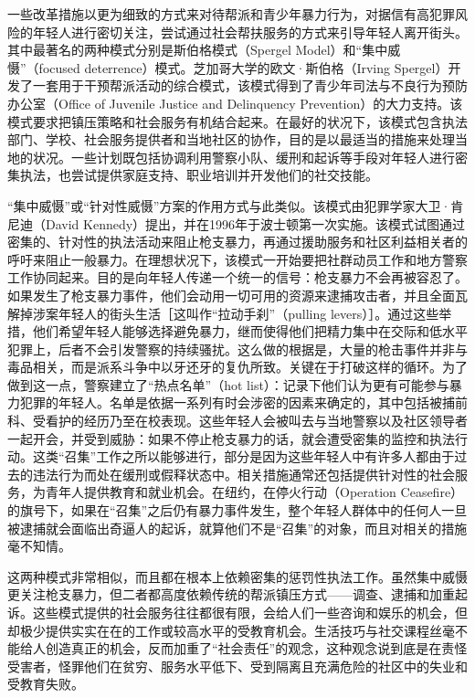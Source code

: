 \documentclass[fontset=fandol, a4paper, 12pt, openright]{ctexbook}
\begin{document}
一些改革措施以更为细致的方式来对待帮派和青少年暴力行为，对据信有高犯罪风险的年轻人进行密切关注，尝试通过社会帮扶服务的方式来引导年轻人离开街头。其中最著名的两种模式分别是斯伯格模式（Spergel Model）和“集中威慑”（focused deterrence）模式。芝加哥大学的欧文·斯伯格（Irving Spergel）开发了一套用于干预帮派活动的综合模式，该模式得到了青少年司法与不良行为预防办公室（Office of Juvenile Justice and Delinquency Prevention）的大力支持。该模式要求把镇压策略和社会服务有机结合起来。在最好的状况下，该模式包含执法部门、学校、社会服务提供者和当地社区的协作，目的是以最适当的措施来处理当地的状况。一些计划既包括协调利用警察小队、缓刑和起诉等手段对年轻人进行密集执法，也尝试提供家庭支持、职业培训并开发他们的社交技能。

“集中威慑”或“针对性威慑”方案的作用方式与此类似。该模式由犯罪学家大卫·肯尼迪（David Kennedy）提出，并在1996年于波士顿第一次实施。该模式试图通过密集的、针对性的执法活动来阻止枪支暴力，再通过援助服务和社区利益相关者的呼吁来阻止一般暴力。在理想状况下，该模式一开始要把社群动员工作和地方警察工作协同起来。目的是向年轻人传递一个统一的信号：枪支暴力不会再被容忍了。如果发生了枪支暴力事件，他们会动用一切可用的资源来逮捕攻击者，并且全面瓦解掉涉案年轻人的街头生活［这叫作“拉动手刹”（pulling levers）］。通过这些举措，他们希望年轻人能够选择避免暴力，继而使得他们把精力集中在交际和低水平犯罪上，后者不会引发警察的持续骚扰。这么做的根据是，大量的枪击事件并非与毒品相关，而是派系斗争中以牙还牙的复仇所致。关键在于打破这样的循环。为了做到这一点，警察建立了“热点名单”（hot list）：记录下他们认为更有可能参与暴力犯罪的年轻人。名单是依据一系列有时会涉密的因素来确定的，其中包括被捕前科、受看护的经历乃至在校表现。这些年轻人会被叫去与当地警察以及社区领导者一起开会，并受到威胁：如果不停止枪支暴力的话，就会遭受密集的监控和执法行动。这类“召集”工作之所以能够进行，部分是因为这些年轻人中有许多人都由于过去的违法行为而处在缓刑或假释状态中。相关措施通常还包括提供针对性的社会服务，为青年人提供教育和就业机会。在纽约，在停火行动（Operation Ceasefire）的旗号下，如果在“召集”之后仍有暴力事件发生，整个年轻人群体中的任何人一旦被逮捕就会面临出奇逼人的起诉，就算他们不是“召集”的对象，而且对相关的措施毫不知情。



这两种模式非常相似，而且都在根本上依赖密集的惩罚性执法工作。虽然集中威慑更关注枪支暴力，但二者都高度依赖传统的帮派镇压方式——调查、逮捕和加重起诉。这些模式提供的社会服务往往都很有限，会给人们一些咨询和娱乐的机会，但却极少提供实实在在的工作或较高水平的受教育机会。生活技巧与社交课程丝毫不能给人创造真正的机会，反而加重了“社会责任”的观念，这种观念说到底是在责怪受害者，怪罪他们在贫穷、服务水平低下、受到隔离且充满危险的社区中的失业和受教育失败。
\end{document}
